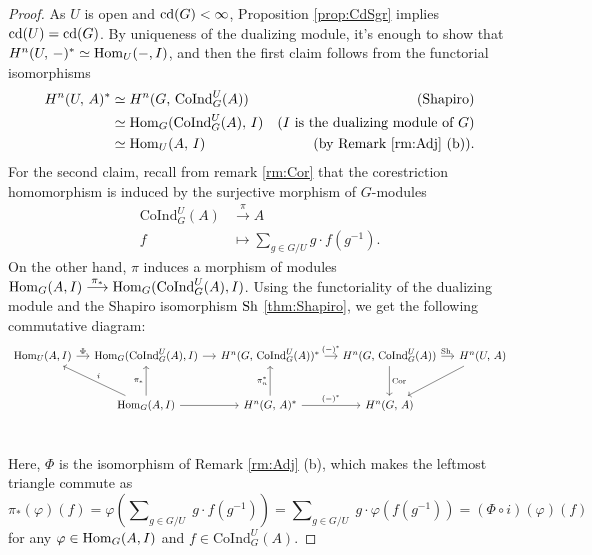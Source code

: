 \documentclass[a4paper, oneside]{memoir}
\begin{document}
\begin{proof}
    As \(U\) is open and \(\operatorname{cd}(G)<\infty\), Proposition \ref{prop:CdSgr} implies \(\operatorname{cd}(U)=\operatorname{cd}(G)\). By uniqueness of the dualizing module, it's enough to show that
    \(H^{n}( U, \, - )^*\simeq\operatorname{Hom}_U(-,I)\), and then the first claim follows from the functorial isomorphisms
    \begin{align*}
        H^{n}( U, \, A )^* & \simeq H^{n}( G, \, \mathrm{CoInd}_G^U(A) )   & \text{(Shapiro)}                            \\
                      & \simeq \operatorname{Hom}_G(\mathrm{CoInd}_G^U(A),\,I) & \text{($I$ is the dualizing module of $G$)} \\
                      & \simeq \operatorname{Hom}_U(A,\,I)                     & \text{(by Remark \eqref{rm:Adj} (b))}.
    \end{align*}
    For the second claim, recall from remark \ref{rm:Cor} that the corestriction homomorphism is induced by the surjective morphism of \(G\)-modules
    \begin{align*}
        \mathrm{CoInd}_G^U(A) & \overset{\pi}{\longrightarrow} A               \\
        f                     & \longmapsto \sum_{g\in G/U}{g\cdot f(g^{-1})}.
    \end{align*}
    On the other hand, $\pi$ induces a morphism of modules \(\operatorname{Hom}_G(A,I)\overset{\pi_*}{\longrightarrow}\operatorname{Hom}_G(\mathrm{CoInd}_G^U(A),I)\).
    Using the functoriality of the dualizing module and the Shapiro isomorphism $\operatorname{Sh}$ \eqref{thm:Shapiro},
    we get the following commutative diagram:
    \[
        \begin{tikzcd}[column sep=small, row sep=large]
            \Hom_U(A,I)
            \rar["\Phi"] &
            \Hom_G(\mathrm{CoInd}_G^U(A), I)
            \rar &
            \H{n}{G}{\mathrm{CoInd}_G^U(A)}^*
            \rar["(-)^*"]&\H{n}{G}{\mathrm{CoInd}_G^U(A)}
            \rar["\sh\ "]
            \ar[d, "\Cor"]&\H{n}{U}{A}\ar[dl] \\
            &
            \Hom_G(A,I) \ar[swap, lu, "i"]
            \ar[u, "\pi_*"]
            \rar &
            \H{n}{G}{A}^*
            \ar[u,"\pi_n^*"]
            \rar["(-)^*"] &
            \H{n}{G}{A} \\
        \end{tikzcd}
    \]
    Here, $\Phi$ is the isomorphism of Remark \ref{rm:Adj} (b),
    which makes the leftmost triangle commute as
    \[
        \pi_*(\varphi)(f) = \varphi\left(\sum\nolimits_{g\in G/U}\;{g\cdot f(g^{-1} )}\right) = \sum\nolimits_{g\in G/U}\;{g\cdot \varphi(f(g^{-1}))} = (\Phi\circ i) (\varphi)(f)
    \]
    for any \(\varphi\in\operatorname{Hom}_G(A,I)\) and \(f\in\mathrm{CoInd}_G^U(A)\).
\end{proof}
\end{document}
